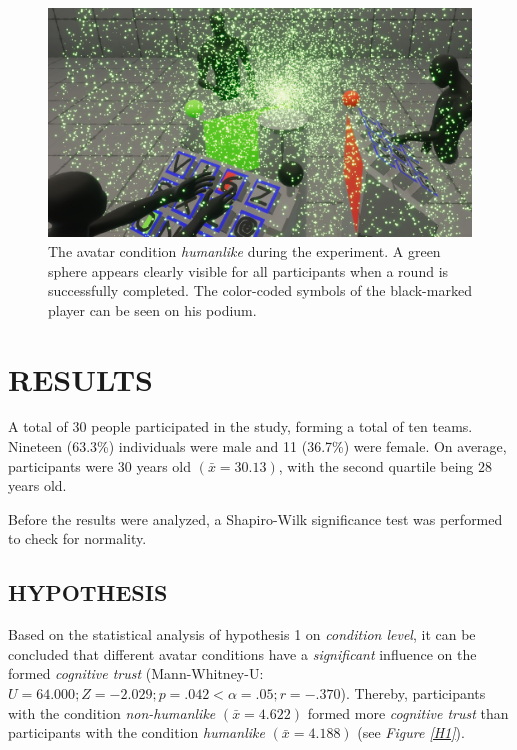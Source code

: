 \documentclass[sigchi]{acmart}
\begin{document}
	
\begin{figure}[H]
  \centering
  \includegraphics[width=0.7\linewidth]{Abbildungen/RoundSuccsessful4.jpg}
  \caption[The avatars in the experimental environment]{The avatar condition \textit{humanlike} during the experiment. A green sphere appears clearly visible for all participants when a round is successfully completed. The color-coded symbols of the black-marked player can be seen on his podium.}
  \label{AvatareImEinsatz}
\end{figure}
%

\section{RESULTS}
A total of 30 people participated in the study, forming a total of ten teams. Nineteen (63.3\%) individuals were male and 11 (36.7\%) were female. On average, participants were 30 years old $(\bar{x} = 30.13)$, with the second quartile being $28$ years old. %

Before the results were analyzed, a Shapiro-Wilk significance test was performed to check for normality.

\subsection{HYPOTHESIS}
Based on the statistical analysis of hypothesis 1 on \textit{condition level}, it can be concluded that different avatar conditions have a \textit{significant} influence on the formed \textit{cognitive trust} (Mann-Whitney-U: $U = 64.000; Z = -2.029; p =.042 < \alpha =.05; r =-.370$). Thereby, participants with the condition \textit{non-humanlike} $(\bar{x} = 4.622)$ formed more \textit{cognitive trust} than participants with the condition \textit{humanlike} $(\bar{x} = 4.188)$ (see \textit{Figure \ref{H1}}). 
\end{document}
